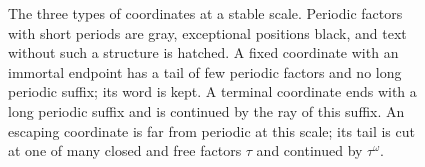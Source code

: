 \begin{figure}[t]
\caption{The three types of coordinates at a stable scale. Periodic factors
with short periods are gray, exceptional positions black, and text without
such a structure is hatched. A fixed coordinate with an immortal endpoint
has a tail of few periodic factors and no long periodic suffix; its word is
kept. A terminal coordinate ends with a long periodic suffix and is
continued by the ray of this suffix. An escaping coordinate is far from
periodic at this scale; its tail is cut at one of many closed and free
factors $\tau$ and continued by $\tau^\omega$.}
\label{fig:types}
\end{figure}
